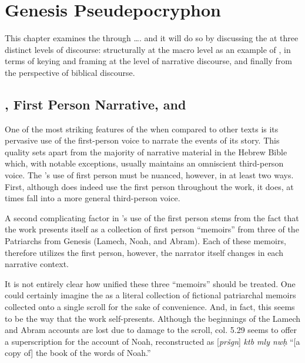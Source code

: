 
\chapter{Genesis Pseudepocryphon}

 This chapter examines the \ga through \ldots{}. and it will do so by discussing the \ga at three distinct levels of discourse: structurally at the macro level as an example of \psy, in terms of keying and framing at the level of narrative discourse, and finally from the perspective of biblical discourse.

 \section{\GA, First Person Narrative, and \Psy}

 One of the most striking features of the \ga when compared to other \rwb texts is its pervasive use of the first-person voice to narrate the events of its story. This quality sets \ga apart from the majority of narrative material in the Hebrew Bible which, with notable exceptions, usually maintains an omniscient third-person voice. The \ga's use of first person must be nuanced, however, in at least two ways. First, although \ga does indeed use the first person throughout the work, it does, at times fall into a more general third-person voice.  %
 
 A second complicating factor in \ga's use of the first person stems from the fact that the work presents itself as a collection of first person ``memoirs'' from three of the Patriarchs from Genesis (Lamech, Noah, and Abram). Each of these memoirs, therefore utilizes the first person, however, the narrator itself changes in each narrative context.
 
 It is not entirely clear how unified these three ``memoirs'' should be treated. One could certainly imagine the \ga as a literal collection of fictional patriarchal memoirs collected onto a single scroll for the sake of convenience. And, in fact, this seems to be the way that the work self-presents. Although the beginnings of the Lamech and Abram accounts are lost due to damage to the scroll, col. 5.29 seems to offer a superscription for the account of Noah, reconstructed as [\emph{pršgn}] \emph{ktb mly nwḥ} ``[a copy of] the book of the words of Noah.''

